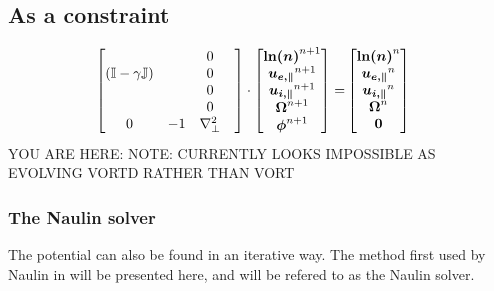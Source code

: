 \subsection{As a constraint}
%
\begin{align*}
    \begin{bmatrix}
                                        & & 0  \\
        (\mathbb{I} - \gamma\mathbb{J}) & & 0  \\
                                        & & 0  \\
                                        & & 0  \\
        0                               & -1 & \nabla_\perp^2 & \\
    \end{bmatrix}
    \cdot
    \begin{bmatrix}
        \boldsymbol{\ln(n)}^{n+1}  \\
        \boldsymbol{u_{e,\|}}^{n+1}\\
        \boldsymbol{u_{i,\|}}^{n+1}\\
        \boldsymbol{\Omega}^{n+1}     \\
        \boldsymbol{\phi}^{n+1}    \\
    \end{bmatrix}
    =&
    \begin{bmatrix}
        \boldsymbol{\ln(n)}^{n}  \\
        \boldsymbol{u_{e,\|}}^{n}\\
        \boldsymbol{u_{i,\|}}^{n}\\
        \boldsymbol{\Omega}^{n}     \\
        \boldsymbol{0}           \\
    \end{bmatrix}
\end{align*}
%
YOU ARE HERE:
NOTE: CURRENTLY LOOKS IMPOSSIBLE AS EVOLVING VORTD RATHER THAN VORT

\subsubsection{The Naulin solver}
%
The potential can also be found in an iterative way. The method first used by
Naulin in \cite{Naulin2008} will be presented here, and will be refered to as
the Naulin solver.

